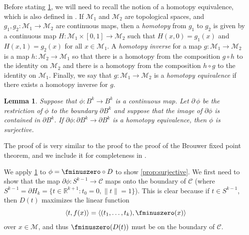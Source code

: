 \documentclass{article}
\numberwithin{equation}{section}
\newcommand{\R}{\mathbb{R}}
\newtheorem{lemma}{Lemma}[section]
\newcommand{\cM}{{\mathcal{M}}}
\newcommand{\cC}{\mathcal{C}}
\begin{document}
Before stating \cref{lem:homotopy_fact}, we will need to recall the notion of a homotopy equivalence, which is also defined in \cite[Chapter 0]{MR1867354}.
If $\cM_1$ and $\cM_2$ are topological spaces, and $g_1, g_2 : \cM_1 \rightarrow \cM_2$ are continuous maps, then a \emph{homotopy} from $g_1$ to $g_2$ is given by a continuous map $H : \cM_1 \times [0,1] \rightarrow \cM_2$ such that $H(x, 0) = g_1(x)$ and $H(x,1) = g_2(x)$ for all $x \in \cM_1$. A \emph{homotopy inverse} for a map $g : \cM_1 \rightarrow \cM_2$ is a map $h : \cM_2 \rightarrow \cM_1$ so that there is a homotopy from the composition $g \circ h$ to the identity on $\cM_2$ and there is a homotopy from the composition $h \circ g$ to the identity on $\cM_1$. Finally, we say that $g : \cM_1 \rightarrow \cM_2$ is a \emph{homotopy equivalence} if there exists a homotopy inverse for $g$.

\begin{lemma}
\label{lem:homotopy_fact}
    Suppose that $\phi : B^k \rightarrow B^k$ is a continuous map. Let $\partial \, \phi$ be the restriction of $\phi$ to the boundary $\partial B^k$ and suppose that the image of $\partial{\phi}$ is contained in $\partial B^k$. If $\partial{\phi} : \partial B^k \rightarrow \partial B^k$ is a homotopy equivalence, then $\phi$ is surjective.
\end{lemma}

The proof of  is very similar to the proof to the proof of the Brouwer fixed point theorem, and we include it for completeness in .

We apply \cref{lem:homotopy_fact} to $\phi = \fminuszero \circ D$ to show \cref{prop:surjective}. We first need to show that the map $\partial{\phi} : S^{k-1} \rightarrow \cC$ maps onto the boundary of $\cC$ (where $S^{k-1} = \partial H_k = \{t \in \R^{k+1}: t_0 = 0, \|t\|=1\}$). This is clear because if $t \in S^{k-1}$, then $D(t)$ maximizes the linear function
\[\langle t, f(x) \rangle = \langle (t_1,\dots,t_k), \fminuszero(x)\rangle
\]
over $x \in \cM$, and thus $\fminuszero(D(t))$ must be on the boundary of $\cC$.
\end{document}

